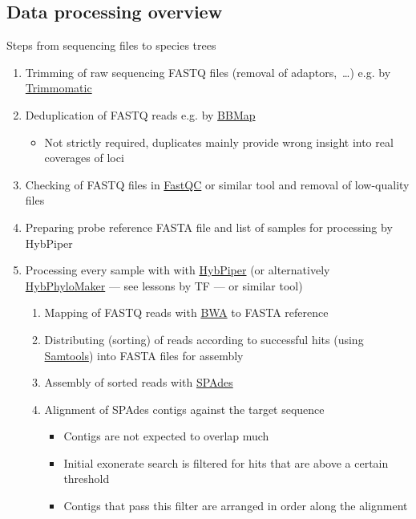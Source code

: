 \documentclass[compress, ucs, xelatex, 11pt, xcolor=x11names, aspectratio=169,
	hyperref={
		bookmarks=true,
		unicode=true,
		colorlinks=true,
		pdftitle={HybSeq course},
		plainpages=false,
		pdfauthor={Vojtech Zeisek},
		pdfsubject={Practical processing of HybSeq target enrichment sequencing data on computing grids like MetaCentrum},
		pdfcreator={XeLaTeX},
		pdfkeywords={BASH, command line, GNU, HybSeq, Linux, MetaCentrum, sequencing shell, target enrichment},
		linkcolor=Turquoise4, %
		anchorcolor=DodgerBlue4, %
		citecolor=DodgerBlue4, %
		filecolor=DodgerBlue4, %
		menucolor=Tan4, %
		urlcolor=DarkOliveGreen4, %
		pdftex},
	url={hyphens, lowtilde} %
	]{beamer}
\begin{document}
\subsection{Data processing overview}

\begin{frame}[allowframebreaks]{Steps from sequencing files to species trees}
	\begin{enumerate}
		\item Trimming of raw sequencing FASTQ files (removal of adaptors,~\ldots) e.g. by \href{http://www.usadellab.org/cms/?page=trimmomatic}{Trimmomatic}
		\item Deduplication of FASTQ reads e.g. by \href{https://sourceforge.net/projects/bbmap/}{BBMap}
		\begin{itemize}
			\item Not strictly required, duplicates mainly provide wrong insight into real coverages of loci
		\end{itemize}
		\item Checking of FASTQ files in \href{https://www.bioinformatics.babraham.ac.uk/projects/fastqc/}{FastQC} or similar tool and removal of low-quality files
		\item Preparing probe reference FASTA file and list of samples for processing by HybPiper
		\item Processing every sample with with \href{https://github.com/mossmatters/HybPiper/wiki}{HybPiper} (or alternatively \href{https://github.com/tomas-fer/HybPhyloMaker}{HybPhyloMaker} --- see lessons by TF --- or similar tool)
		\begin{enumerate}
			\item Mapping of FASTQ reads with \href{https://github.com/lh3/bwa}{BWA} to FASTA reference
			\item Distributing (sorting) of reads according to successful hits (using \href{https://www.htslib.org/}{Samtools}) into FASTA files for assembly
			\item Assembly of sorted reads with \href{https://github.com/ablab/spades}{SPAdes}
			\item Alignment of SPAdes contigs against the target sequence
			\begin{itemize}
				\item Contigs are not expected to overlap much
				\item Initial exonerate search is filtered for hits that are above a certain threshold
				\item Contigs that pass this filter are arranged in order along the alignment

\end{itemize}
\end{enumerate}
\end{enumerate}
\end{frame}
\end{document}
